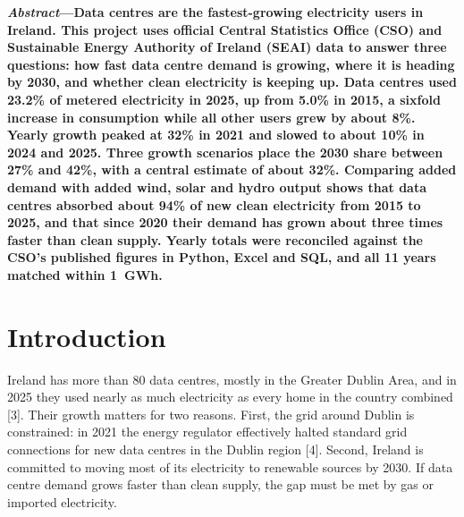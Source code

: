 \documentclass[10pt,twocolumn,a4paper]{article}
\begin{document}

\noindent\textbf{\textit{Abstract}---Data centres are the fastest-growing electricity users in Ireland. This project uses official Central Statistics Office (CSO) and Sustainable Energy Authority of Ireland (SEAI) data to answer three questions: how fast data centre demand is growing, where it is heading by 2030, and whether clean electricity is keeping up. Data centres used 23.2\% of metered electricity in 2025, up from 5.0\% in 2015, a sixfold increase in consumption while all other users grew by about 8\%. Yearly growth peaked at 32\% in 2021 and slowed to about 10\% in 2024 and 2025. Three growth scenarios place the 2030 share between 27\% and 42\%, with a central estimate of about 32\%. Comparing added demand with added wind, solar and hydro output shows that data centres absorbed about 94\% of new clean electricity from 2015 to 2025, and that since 2020 their demand has grown about three times faster than clean supply. Yearly totals were reconciled against the CSO's published figures in Python, Excel and SQL, and all 11 years matched within 1~GWh.}

\section{Introduction}

Ireland has more than 80 data centres, mostly in the Greater Dublin Area, and in 2025 they used nearly as much electricity as every home in the country combined [3]. Their growth matters for two reasons. First, the grid around Dublin is constrained: in 2021 the energy regulator effectively halted standard grid connections for new data centres in the Dublin region [4]. Second, Ireland is committed to moving most of its electricity to renewable sources by 2030. If data centre demand grows faster than clean supply, the gap must be met by gas or imported electricity.
\end{document}
